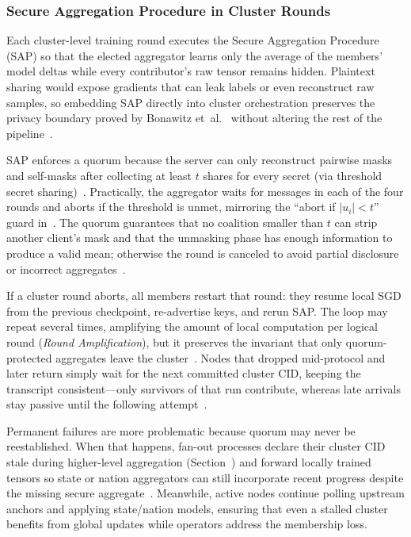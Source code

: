 \subsubsection{Secure Aggregation Procedure in Cluster Rounds}
\label{sec:secure-aggregation-sap}

Each cluster-level training round executes the Secure Aggregation Procedure (SAP) so that the elected aggregator learns only the average of the members' model deltas while every contributor's raw tensor remains hidden. Plaintext sharing would expose gradients that can leak labels or even reconstruct raw samples, so embedding SAP directly into cluster orchestration preserves the privacy boundary proved by Bonawitz et~al.~\cite{SecureAggregation} without altering the rest of the pipeline~\cite{DLG,Geiping2020Inverting,Melis2019Leakage}.

SAP enforces a quorum because the server can only reconstruct pairwise masks and self-masks after collecting at least $t$ shares for every secret (via threshold secret sharing)~\cite{SecureAggregation,shamir1979share}. Practically, the aggregator waits for messages in each of the four rounds and aborts if the threshold is unmet, mirroring the ``abort if $|u_i| < t$'' guard in~\cite{SecureAggregation}. The quorum guarantees that no coalition smaller than $t$ can strip another client's mask and that the unmasking phase has enough information to produce a valid mean; otherwise the round is canceled to avoid partial disclosure or incorrect aggregates~\cite{SecureAggregation}.

If a cluster round aborts, all members restart that round: they resume local SGD from the previous checkpoint, re-advertise keys, and rerun SAP. The loop may repeat several times, amplifying the amount of local computation per logical round (\emph{Round Amplification})\label{def:round-amplification}, but it preserves the invariant that only quorum-protected aggregates leave the cluster~\cite{SecureAggregation,MansouriFTSA}. Nodes that dropped mid-protocol and later return simply wait for the next committed cluster CID, keeping the transcript consistent—only survivors of that run contribute, whereas late arrivals stay passive until the following attempt~\cite{SecureAggregation,MansouriSoK}.

Permanent failures are more problematic because quorum may never be reestablished. When that happens, fan-out processes declare their cluster CID stale during higher-level aggregation (Section~) and forward locally trained tensors so state or nation aggregators can still incorporate recent progress despite the missing secure aggregate~\cite{MansouriFTSA}. Meanwhile, active nodes continue polling upstream anchors and applying state/nation models, ensuring that even a stalled cluster benefits from global updates while operators address the membership loss.